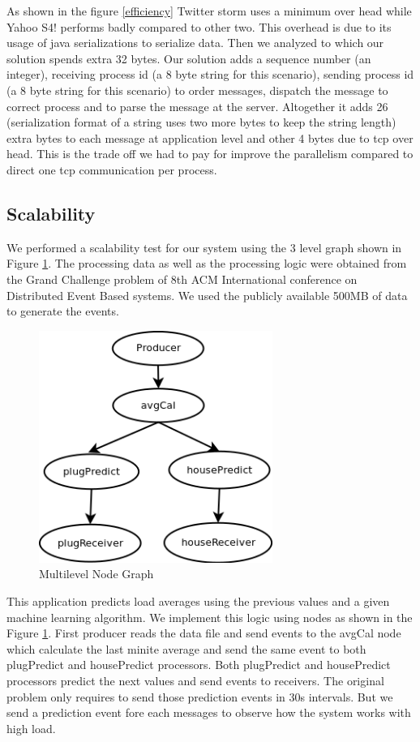 As shown in the figure \ref{efficiency} Twitter storm uses a minimum over head while Yahoo S4! performs badly compared to other two. This overhead is due to its usage of  java serializations to serialize data. Then we analyzed to which our solution spends extra 32 bytes. Our solution adds a sequence number (an integer), receiving process id (a 8 byte string for this scenario), sending process id (a 8 byte string for this scenario) to order messages, dispatch the message to correct process and to parse the message at the server. Altogether it adds 26 (serialization format of a string uses two more bytes to keep the string length) extra bytes to each message at application level and other 4 bytes due to tcp over head. This is the trade off we had to pay for improve the parallelism compared to direct one tcp communication per process. 

\subsection{Scalability}
We performed a scalability test for our system using the 3 level graph shown in Figure \ref{multigraph}. The processing data as well as the processing logic were obtained from the Grand Challenge problem of 8th ACM International conference on Distributed Event Based systems. We used the publicly available 500MB of data to generate the events. 

\begin{figure}[!t]
        \centering
        \includegraphics[width=3.0in]{multigraph.png}
        \caption{Multilevel Node Graph}
        \label{multigraph}
\end{figure}

This application predicts load averages using the previous values and a given machine learning algorithm. We implement this logic using nodes as shown in the Figure \ref{multigraph}. First producer reads the data file and send events to the avgCal node which calculate the last minite average and send the same event to both plugPredict and housePredict processors. Both plugPredict and housePredict processors predict the next values and send events to receivers. The original problem only requires to send those prediction events in 30s intervals. But we send a prediction event fore each messages to observe how the system works with high load.
 
